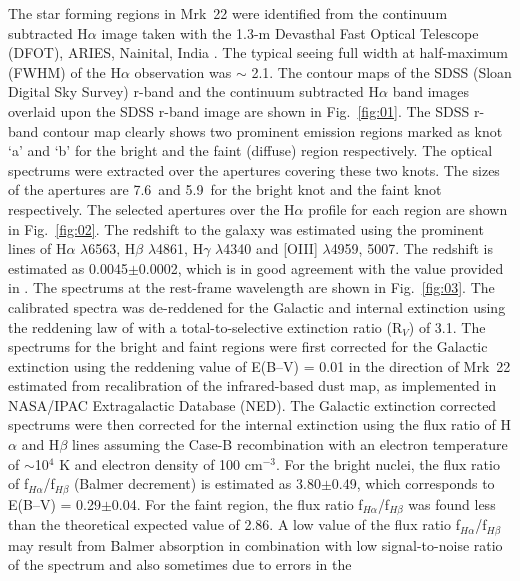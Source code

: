 \documentclass[useAMS,usenatbib]{mn2e}
\begin{document}
The star forming regions in Mrk~22 were identified from the continuum subtracted H${\alpha}$ image taken with the 1.3-m Devasthal Fast Optical Telescope (DFOT), ARIES, Nainital, India \citep{2016MNRAS.462...92J}. The typical seeing full width at half-maximum (FWHM) of the H$\alpha$ observation was $\sim$ 2.1\arcsec. The contour maps of the SDSS (Sloan Digital Sky Survey) r-band and the continuum subtracted H${\alpha}$ band images overlaid upon the SDSS r-band image are shown in Fig.~\ref{fig:01}. The SDSS r-band contour map clearly shows two prominent emission regions marked as knot `a' and `b' for the bright and the faint (diffuse) region respectively. The optical spectrums were extracted over the apertures covering these two knots. The sizes of the apertures are 7.6\arcsec~and 5.9\arcsec~for the bright knot and the faint knot respectively. The selected apertures over the H$\alpha$ profile for each region are shown in Fig.~\ref{fig:02}. The redshift to the galaxy was estimated using the prominent lines of H${\alpha}$ $\lambda$6563, H${\beta}$ $\lambda$4861, H${\gamma}$ $\lambda$4340 and [O{\small{III}}] $\lambda$4959, 5007. The redshift is estimated as 0.0045$\pm$0.0002, which is in good agreement with the value provided in \citet{1999A&AS..139....1T}. The spectrums at the rest-frame wavelength are shown in Fig.~\ref{fig:03}. The calibrated spectra was de-reddened for the Galactic and internal extinction using the reddening law of \citet{1989ApJ...345..245C} with a total-to-selective extinction ratio (R$_{V}$) of 3.1. The spectrums for the bright and faint regions were first corrected for the Galactic extinction using the reddening value of E(B--V) = 0.01 in the direction of Mrk~22 estimated from \citet{2011ApJ...737..103S} recalibration of the \citet{1998ApJ...500..525S} infrared-based dust map, as implemented in NASA/IPAC Extragalactic Database (NED). The Galactic extinction corrected spectrums were then corrected for the internal extinction using the flux ratio of H${\alpha}$ and H${\beta}$ lines assuming the Case-B recombination \citep{1989SvA....33..694O,2002A&A...389..845K} with an electron temperature of $\sim$10$^{4}$ K and electron density of 100 cm$^{-3}$. For the bright nuclei, the flux ratio of f$_{H\alpha}$/f$_{H\beta}$ (Balmer decrement) is estimated as 3.80$\pm$0.49, which corresponds to E(B--V) = 0.29$\pm$0.04. For the faint region, the flux ratio f$_{H\alpha}$/f$_{H\beta}$ was found less than the theoretical expected value of 2.86. A low value of the flux ratio f$_{H\alpha}$/f$_{H\beta}$ may result from Balmer absorption \citep{1969MNRAS.145...91S} in combination with low signal-to-noise ratio of the spectrum and also sometimes due to errors in the
\end{document}
